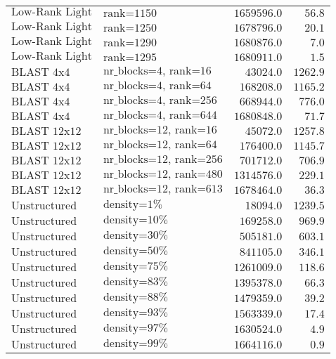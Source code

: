 \begin{longtable}{llrr}
$\text{Low-Rank Light}$ & $\text{rank=1150}$ & $1659596.0$ & $56.8$\\
$\text{Low-Rank Light}$ & $\text{rank=1250}$ & $1678796.0$ & $20.1$\\
$\text{Low-Rank Light}$ & $\text{rank=1290}$ & $1680876.0$ & $7.0$\\
$\text{Low-Rank Light}$ & $\text{rank=1295}$ & $1680911.0$ & $1.5$\\
$\text{BLAST 4x4}$ & $\text{nr\_blocks=4, rank=16}$ & $43024.0$ & $1262.9$\\
$\text{BLAST 4x4}$ & $\text{nr\_blocks=4, rank=64}$ & $168208.0$ & $1165.2$\\
$\text{BLAST 4x4}$ & $\text{nr\_blocks=4, rank=256}$ & $668944.0$ & $776.0$\\
$\text{BLAST 4x4}$ & $\text{nr\_blocks=4, rank=644}$ & $1680848.0$ & $71.7$\\
$\text{BLAST 12x12}$ & $\text{nr\_blocks=12, rank=16}$ & $45072.0$ & $1257.8$\\
$\text{BLAST 12x12}$ & $\text{nr\_blocks=12, rank=64}$ & $176400.0$ & $1145.7$\\
$\text{BLAST 12x12}$ & $\text{nr\_blocks=12, rank=256}$ & $701712.0$ & $706.9$\\
$\text{BLAST 12x12}$ & $\text{nr\_blocks=12, rank=480}$ & $1314576.0$ & $229.1$\\
$\text{BLAST 12x12}$ & $\text{nr\_blocks=12, rank=613}$ & $1678464.0$ & $36.3$\\
$\text{Unstructured}$ & $\text{density=1\%}$ & $18094.0$ & $1239.5$\\
$\text{Unstructured}$ & $\text{density=10\%}$ & $169258.0$ & $969.9$\\
$\text{Unstructured}$ & $\text{density=30\%}$ & $505181.0$ & $603.1$\\
$\text{Unstructured}$ & $\text{density=50\%}$ & $841105.0$ & $346.1$\\
$\text{Unstructured}$ & $\text{density=75\%}$ & $1261009.0$ & $118.6$\\
$\text{Unstructured}$ & $\text{density=83\%}$ & $1395378.0$ & $66.3$\\
$\text{Unstructured}$ & $\text{density=88\%}$ & $1479359.0$ & $39.2$\\
$\text{Unstructured}$ & $\text{density=93\%}$ & $1563339.0$ & $17.4$\\
$\text{Unstructured}$ & $\text{density=97\%}$ & $1630524.0$ & $4.9$\\
$\text{Unstructured}$ & $\text{density=99\%}$ & $1664116.0$ & $0.9$\\
\end{longtable}


